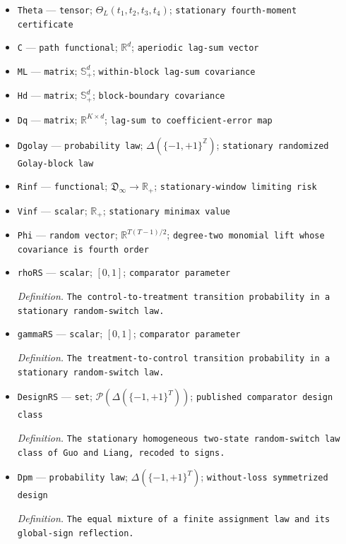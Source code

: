 \documentclass{article}
\begin{document}
\begin{itemize}
  \item \texttt{Theta} --- \texttt{tensor}; \(\Theta_L(t_1,t_2,t_3,t_4)\); \texttt{stationary fourth-\allowbreak{}moment certificate}
  \item \texttt{C} --- \texttt{path functional}; \(\mathbb R^d\); \texttt{aperiodic lag-\allowbreak{}sum vector}
  \item \texttt{ML} --- \texttt{matrix}; \(\mathbb S_+^d\); \texttt{within-\allowbreak{}block lag-\allowbreak{}sum covariance}
  \item \texttt{Hd} --- \texttt{matrix}; \(\mathbb S_+^d\); \texttt{block-\allowbreak{}boundary covariance}
  \item \texttt{Dq} --- \texttt{matrix}; \(\mathbb R^{K\times d}\); \texttt{lag-\allowbreak{}sum to coefficient-\allowbreak{}error map}
  \item \texttt{Dgolay} --- \texttt{probability law}; \(\Delta(\{-1,+1\}^{\mathbb Z})\); \texttt{stationary randomized Golay-\allowbreak{}block law}
  \item \texttt{Rinf} --- \texttt{functional}; \(\mathfrak D_{\infty}\to\mathbb R_+\); \texttt{stationary-\allowbreak{}window limiting risk}
  \item \texttt{Vinf} --- \texttt{scalar}; \(\mathbb R_+\); \texttt{stationary minimax value}
  \item \texttt{Phi} --- \texttt{random vector}; \(\mathbb R^{T(T-1)/2}\); \texttt{degree-\allowbreak{}two monomial lift whose covariance is fourth order}
  \item \texttt{rhoRS} --- \texttt{scalar}; \([0,1]\); \texttt{comparator parameter}
  \par\smallskip\noindent\emph{Definition.} \texttt{The control-\allowbreak{}to-\allowbreak{}treatment transition probability in a stationary random-\allowbreak{}switch law.}
  \item \texttt{gammaRS} --- \texttt{scalar}; \([0,1]\); \texttt{comparator parameter}
  \par\smallskip\noindent\emph{Definition.} \texttt{The treatment-\allowbreak{}to-\allowbreak{}control transition probability in a stationary random-\allowbreak{}switch law.}
  \item \texttt{DesignRS} --- \texttt{set}; \(\mathcal P(\Delta(\{-1,+1\}^T))\); \texttt{published comparator design class}
  \par\smallskip\noindent\emph{Definition.} \texttt{The stationary homogeneous two-\allowbreak{}state random-\allowbreak{}switch law class of Guo and Liang,\allowbreak{} recoded to signs.}
  \item \texttt{Dpm} --- \texttt{probability law}; \(\Delta(\{-1,+1\}^T)\); \texttt{without-\allowbreak{}loss symmetrized design}
  \par\smallskip\noindent\emph{Definition.} \texttt{The equal mixture of a finite assignment law and its global-\allowbreak{}sign reflection.}
\end{itemize}
\end{document}
